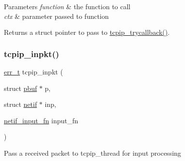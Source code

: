 \begin{DoxyParams}{Parameters}
{\em function} & the function to call \\
\hline
{\em ctx} & parameter passed to function \\
\hline
\end{DoxyParams}
\begin{DoxyReturn}{Returns}
a struct pointer to pass to \hyperlink{native_2lwip_2src_2api_2tcpip_8c_acfc81ad493f68714a22b3b8ea7d04378}{tcpip\+\_\+trycallback()}. 
\end{DoxyReturn}
\mbox{\label{openmote-cc2538_2lwip_2src_2include_2lwip_2tcpip_8h_a93043b3c66dbe4a15a60299c6199d102}} 
\subsubsection{\texorpdfstring{tcpip\+\_\+inpkt()}{tcpip\_inpkt()}}
{\footnotesize\ttfamily \hyperlink{group__infrastructure__errors_gaf02d9da80fd66b4f986d2c53d7231ddb}{err\+\_\+t} tcpip\+\_\+inpkt (\begin{DoxyParamCaption}\item[{struct \hyperlink{structpbuf}{pbuf} $\ast$}]{p,  }\item[{struct \hyperlink{structnetif}{netif} $\ast$}]{inp,  }\item[{\hyperlink{openmote-cc2538_2lwip_2src_2include_2lwip_2netif_8h_ab2302b1b64ac7b95f24c6bab754a575e}{netif\+\_\+input\+\_\+fn}}]{input\+\_\+fn }\end{DoxyParamCaption})}

Pass a received packet to tcpip\+\_\+thread for input processing


